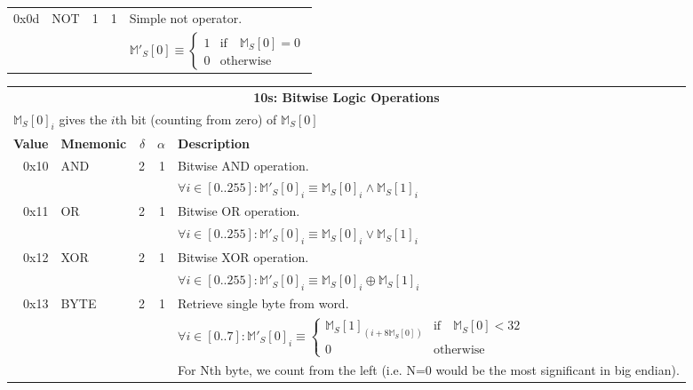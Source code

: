 \documentclass[9pt,oneside]{amsart}
\begin{document}
\begin{tabular*}{\columnwidth}[h]{rlrrl}
\midrule
0x0d & {\small NOT} & 1 & 1 & Simple not operator. \\
&&&& $\mathbb{M}'_S[0] \equiv \begin{cases} 1 & \text{if} \quad \mathbb{M}_S[0] = 0 \\ 0 & \text{otherwise} \end{cases}$ \\
\end{tabular*}

\begin{tabular*}{\columnwidth}[h]{rlrrl}
\toprule
\multicolumn{5}{c}{\textbf{10s: Bitwise Logic Operations}} \\
\multicolumn{5}{l}{$\mathbb{M}_S[0]_i$ gives the $i$th bit (counting from zero) of $\mathbb{M}_S[0]$} \vspace{5pt} \\
\textbf{Value} & \textbf{Mnemonic} & $\delta$ & $\alpha$ & \textbf{Description} \vspace{5pt} \\
0x10 & {\small AND} & 2 & 1 & Bitwise AND operation. \\
&&&& $\forall i \in [0..255]: \mathbb{M}'_S[0]_i \equiv \mathbb{M}_S[0]_i \wedge \mathbb{M}_S[1]_i$ \\
\midrule
0x11 & {\small OR} & 2 & 1 & Bitwise OR operation. \\
&&&& $\forall i \in [0..255]: \mathbb{M}'_S[0]_i \equiv \mathbb{M}_S[0]_i \vee \mathbb{M}_S[1]_i$ \\
\midrule
0x12 & {\small XOR} & 2 & 1 & Bitwise XOR operation. \\
&&&& $\forall i \in [0..255]: \mathbb{M}'_S[0]_i \equiv \mathbb{M}_S[0]_i \oplus \mathbb{M}_S[1]_i$ \\
\midrule
0x13 & {\small BYTE} & 2 & 1 & Retrieve single byte from word. \\
&&&& $\forall i \in [0..7]: \mathbb{M}'_S[0]_i \equiv \begin{cases} \mathbb{M}_S[1]_{(i + 8\mathbb{M}_S[0])} & \text{if} \quad \mathbb{M}_S[0] < 32 \\ 0 & \text{otherwise} \end{cases} $\\
&&&& For Nth byte, we count from the left (i.e. N=0 would be the most significant in big endian). \\
\bottomrule
\end{tabular*}
\end{document}
